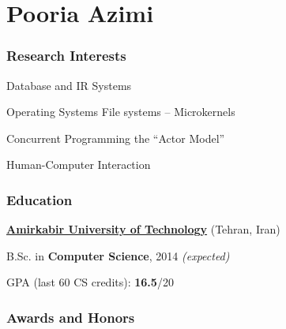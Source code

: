 \documentclass{tccv}
\begin{document}
\thispagestyle{empty}
\part{Pooria Azimi}





\section{Research Interests}


\begin{research_interest}


\item{Database and IR Systems}
     {}

\item{Operating Systems}
     {File systems -- Microkernels}

\item{Concurrent Programming}
     {the ``Actor Model''}

\item{Human-Computer Interaction}
     {}

\end{research_interest}








\section{Education}

{\bf \href{https://en.wikipedia.org/wiki/Amirkabir_University_of_Technology}{Amirkabir University of Technology}} (Tehran, Iran)

\hspace{7pt} B.Sc. in {\bf Computer Science}, 2014 {\it(expected)}

\hspace{7pt} GPA (last 60 CS credits): {\bf 16.5}/20






\section{Awards and Honors}
\end{document}
